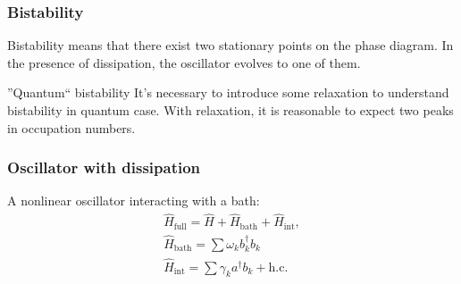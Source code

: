 \documentclass{beamer}
\begin{document}
\begin{frame}
    
\end{frame}

\begin{frame}
    \frametitle{Bistability}
    Bistability means that there exist {\color{red} two stationary points} on the phase diagram. 
    In the presence of dissipation, the oscillator evolves to one of them.

    \begin{block}{''Quantum`` bistability}
    It's necessary to introduce some relaxation to understand bistability in quantum case. With
    relaxation, it is reasonable to expect two peaks in occupation numbers.
    \end{block}
\end{frame}

\begin{frame}
    \frametitle{Oscillator with dissipation}
    A nonlinear oscillator interacting with a bath:    
    \begin{equation*}
        \begin{gathered}
            \hat{H}_{\mathrm{full}} = \hat{H} + \hat{H}_\mathrm{bath} + \hat{H}_\mathrm{int}, \\
            \hat{H}_\mathrm{bath} = \sum \omega_k b_k^\dagger b_k \\
            \hat{H}_\mathrm{int} = \sum \gamma_k a^\dagger b_k + \mathrm{h. c.}
        \end{gathered}
    \end{equation*}
\end{frame}
\end{document}
